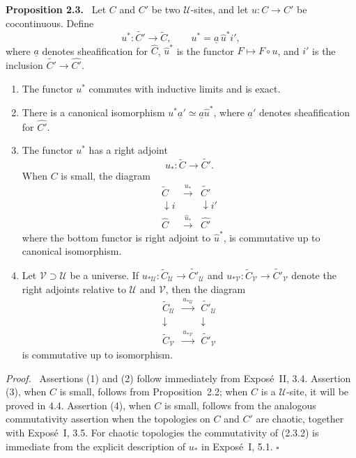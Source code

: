 \documentclass[11pt]{article}
\newcommand{\U}{\mathcal{U}}
\newcommand{\V}{\mathcal{V}}
\newcommand{\qedtext}{\hfill\(\square\)}
\newenvironment{statement}[1]{\par\medskip\noindent\textbf{#1.}\ }{\par\medskip}
\newenvironment{prooftext}{\par\noindent\emph{Proof.}\ }{\par\medskip}
\begin{document}
\begin{statement}{Proposition 2.3}
Let \(C\) and \(C'\) be two \(\U\)-sites, and let \(u:C\to C'\) be cocontinuous. Define
\[
u^*:\widetilde{C'}\longrightarrow\widetilde C,
\qquad
u^*=\underline a\,\widehat u^*i',
\]
where \(\underline a\) denotes sheafification for \(\widehat C\), \(\widehat u^*\) is the functor \(F\mapsto F\circ u\), and \(i'\) is the inclusion \(\widetilde{C'}\to\widehat{C'}\).
\begin{enumerate}[label=\arabic*)]
\item The functor \(u^*\) commutes with inductive limits and is exact.
\item There is a canonical isomorphism \(u^*\underline a'\simeq\underline a\widehat u^*\), where \(\underline a'\) denotes sheafification for \(\widehat{C'}\).
\item The functor \(u^*\) has a right adjoint
\[
u_*:\widetilde C\longrightarrow\widetilde{C'}.
\]
When \(C\) is small, the diagram
\[
\begin{array}{ccc}
\widetilde C & \xrightarrow{u_*} & \widetilde{C'}\\
\downarrow i && \downarrow i'\\
\widehat C & \xrightarrow{\widehat u_*} & \widehat{C'}
\end{array}
\tag{2.3.1}
\]
where the bottom functor is right adjoint to \(\widehat u^*\), is commutative up to canonical isomorphism.
\item Let \(\V\supset\U\) be a universe. If \(u_{*\U}:\widetilde C_{\U}\to\widetilde{C'}_{\U}\) and \(u_{*\V}:\widetilde C_{\V}\to\widetilde{C'}_{\V}\) denote the right adjoints relative to \(\U\) and \(\V\), then the diagram
\[
\begin{array}{ccc}
\widetilde C_{\U} & \xrightarrow{u_{*\U}} & \widetilde{C'}_{\U}\\
\downarrow && \downarrow\\
\widetilde C_{\V} & \xrightarrow{u_{*\V}} & \widetilde{C'}_{\V}
\end{array}
\tag{2.3.2}
\]
is commutative up to isomorphism.
\end{enumerate}
\end{statement}

\begin{prooftext}
Assertions (1) and (2) follow immediately from Expos\'e~II, 3.4. Assertion (3), when \(C\) is small, follows from Proposition~2.2; when \(C\) is a \(\U\)-site, it will be proved in 4.4. Assertion (4), when \(C\) is small, follows from the analogous commutativity assertion when the topologies on \(C\) and \(C'\) are chaotic, together with Expos\'e~I, 3.5. For chaotic topologies the commutativity of (2.3.2) is immediate from the explicit description of \(u_*\) in Expos\'e~I, 5.1. \qedtext
\end{prooftext}
\end{document}
